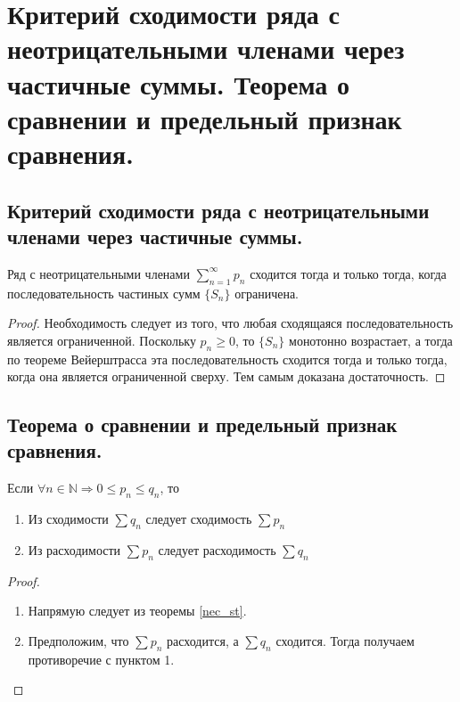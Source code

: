 \section{Критерий сходимости ряда с неотрицательными членами через частичные суммы. Теорема о сравнении и предельный признак сравнения.}

\subsection{Критерий сходимости ряда с неотрицательными членами через частичные суммы.}
\begin{theorem}\label{nec_st}
    Ряд с неотрицательными членами $\sum_{n=1}^{\infty} p_n$ сходится тогда и только тогда, когда последовательность частиных сумм $\{S_n\}$ ограничена.
    \begin{proof}
        Необходимость следует из того, что любая сходящаяся последовательность является ограниченной. Поскольку $p_n \geqslant 0$, то $\{S_n\}$ монотонно возрастает, а тогда по теореме Вейерштрасса эта последовательность сходится тогда и только тогда, когда она является ограниченной сверху. Тем самым доказана достаточность.
    \end{proof}
\end{theorem}

\subsection{Теорема о сравнении и предельный признак сравнения.}
\begin{theorem}\label{first_comp}
    Если $\forall n \in \mathbb{N} \Rightarrow 0 \leqslant p_n \leqslant q_n$, то
    \begin{enumerate}
        \item Из сходимости $\sum q_n$ следует сходимость $\sum p_n$
        \item Из расходимости $\sum p_n$ следует расходимость $\sum q_n$
    \end{enumerate}
    \begin{proof}
        \text{}
        \begin{enumerate}
            \item Напрямую следует из теоремы \ref{nec_st}.
            \item Предположим, что $\sum p_n$ расходится, а $\sum q_n$ сходится. Тогда получаем противоречие с пунктом 1.
        \end{enumerate}
    \end{proof}
\end{theorem}

